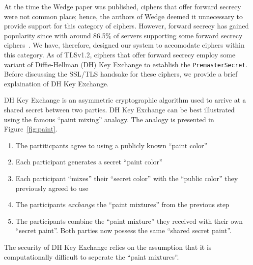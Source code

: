 \documentclass[../../main.tex]{subfiles}
\begin{document}
At the time the Wedge paper was published, ciphers that offer forward
secrecy were not common place; hence, the authors of Wedge deemed it
unnecessary to provide support for this category of ciphers. However,
forward secrecy has gained popularity since with around 86.5\% of
servers supporting some forward secrecy ciphers~\cite{fs_stats}. We have, therefore,
designed our system to accomodate ciphers within this category. As of
TLSv1.2, ciphers that offer forward secrecy employ some variant of
Diffie-Hellman (DH) Key Exchange to establish the
\texttt{PremasterSecret}. Before discussing the SSL/TLS handsake for
these ciphers, we provide a brief explaination of DH Key Exchange.


DH Key Exchange is an asymmetric cryptographic algorithm used to
arrive at a shared secret between two parties. DH Key Exchange can be
best illustrated using the famous ``paint mixing'' analogy. The
analogy is presented in Figure~\ref{fig:paint}.
\begin{enumerate}
  \item The partiticpants agree to using a publicly known ``paint
    color''
  \item Each participant generates a secret ``paint color''
  \item Each participant ``mixes'' their ``secret color'' with the
    ``public color'' they previously agreed to use
  \item The participants \textit{exchange} the ``paint mixtures'' from
    the previous step
  \item The participants combine the ``paint mixture'' they received
    with their own ``secret paint''. Both parties now possess the same
    ``shared secret paint''.
\end{enumerate}
The security of DH Key Exchange relies on the assumption that it is
computationally difficult to seperate the ``paint mixtures''.
\end{document}
